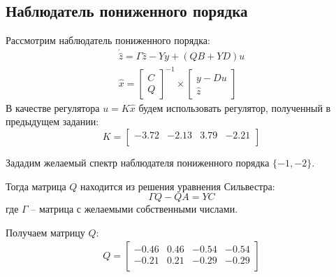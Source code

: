\subsection{Наблюдатель пониженного порядка}
Рассмотрим наблюдатель пониженного порядка:
\begin{equation}
    \begin{array}{ll}
        \dot{\hat{z}} = \Gamma\hat{z} - Yy + (QB + YD)u\\
        \hat{x} = \begin{bmatrix}
            C \\ Q
        \end{bmatrix}^{-1} \times \begin{bmatrix}
            y - Du \\ 
            \hat{z}
        \end{bmatrix}
    \end{array}
\end{equation}
В качестве регулятора $u = K\hat{x}$ будем использовать регулятор, полученный в предыдущем задании:
\begin{equation}
    K = \begin{bmatrix}
        -3.72  & -2.13  & 3.79  & -2.21 \\ 
    \end{bmatrix}
\end{equation}

Зададим желаемый спектр наблюдателя пониженного порядка $\{-1, -2\}$.

Тогда матрица $Q$ находится из решения уравнения Сильвестра: 
\begin{equation}
   \Gamma Q - QA = YC 
\end{equation}
где $\Gamma$ -- матрица с желаемыми собственными числами. 

Получаем матрицу $Q$:
\begin{eqnarray}
    Q = \begin{bmatrix}
        -0.46  & 0.46  & -0.54  & -0.54 \\ 
        -0.21  & 0.21  & -0.29  & -0.29 \\ 
    \end{bmatrix}
\end{eqnarray}

